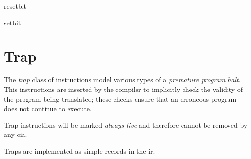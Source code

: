 \begin{instruction}{resetbit}

  \nresults

  \begin{operands}
  \item {}
  \item {}
  \end{operands}
\end{instruction}

\begin{instruction}{setbit}

  \nresults

  \begin{operands}
  \item {}
  \item {}
  \end{operands}
\end{instruction}



\section{Trap}\label{class:trap}

The \emph{trap} class of instructions model various types of a
\emph{premature program halt}.  This instructions are inserted by the
compiler to implicitly check the validity of the program being
translated; these checks ensure that an erroneous program does not
continue to execute.

Trap instructions will be marked \emph{always live} and therefore
cannot be removed by any \ac{cia}.

Traps are implemented as simple  records in the
\ac{ir}.

